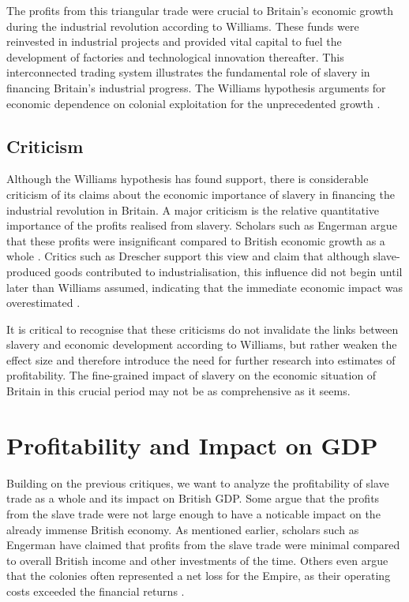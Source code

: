\documentclass[a4paper,11pt]{article}
\begin{document}
The profits from this triangular trade were crucial to Britain's economic growth during the industrial revolution according to Williams. These funds were reinvested in industrial projects and provided vital capital to fuel the development of factories and technological innovation thereafter. This interconnected trading system illustrates the fundamental role of slavery in financing Britain's industrial progress. The Williams hypothesis arguments for economic dependence on colonial exploitation for the unprecedented growth \citep{solow1985}.

\subsection{Criticism}

Although the Williams hypothesis has found support, there is considerable criticism of its claims about the economic importance of slavery in financing the industrial revolution in Britain. A major criticism is the relative quantitative importance of the profits realised from slavery. Scholars such as Engerman argue that these profits were insignificant compared to British economic growth as a whole \citep{eltisengerman2000}. Critics such as Drescher support this view and claim that although slave-produced goods contributed to industrialisation, this influence did not begin until later than Williams assumed, indicating that the immediate economic impact was overestimated \citep{drescher1997}.

It is critical to recognise that these criticisms do not invalidate the links between slavery and economic development according to Williams, but rather weaken the effect size and therefore introduce the need for further research into estimates of profitability. The fine-grained impact of slavery on the economic situation of Britain in this crucial period may not be as comprehensive as it seems.

\section{Profitability and Impact on GDP}

Building on the previous critiques, we want to analyze the profitability of slave trade as a whole and its impact on British GDP. Some argue that the profits from the slave trade were not large enough to have a noticable impact on the already immense British economy. As mentioned earlier, scholars such as Engerman have claimed that profits from the slave trade were minimal compared to overall British income and other investments of the time. Others even argue that the colonies often represented a net loss for the Empire, as their operating costs exceeded the financial returns \citep{eltisengerman2000}.
\end{document}
